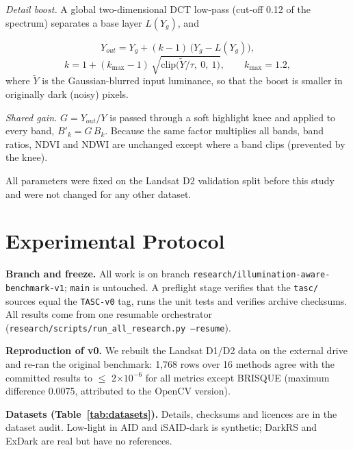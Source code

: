 \documentclass[conference]{IEEEtran}
\begin{document}
\emph{Detail boost.} A global two-dimensional DCT low-pass (cut-off 0.12 of the spectrum) separates a base layer $L(Y_g)$, and

\begin{equation}
Y_{out} = Y_g + (k - 1)\,\bigl(Y_g - L(Y_g)\bigr),
\end{equation}
\begin{equation}
k = 1 + (k_{\max} - 1)\,\sqrt{\mathrm{clip}\bigl(\tilde{Y}/\tau,\ 0,\ 1\bigr)},\qquad k_{\max} = 1.2,
\end{equation}
where $\tilde{Y}$ is the Gaussian-blurred input luminance, so that the boost is smaller in originally dark (noisy) pixels.

\emph{Shared gain.} $G = Y_{out}/Y$ is passed through a soft highlight knee and applied to every band, $B'_k = G\,B_k$. Because the same factor multiplies all bands, band ratios, NDVI and NDWI are unchanged except where a band clips (prevented by the knee).

All parameters were fixed on the Landsat D2 validation split before this study and were not changed for any other dataset.

\section{Experimental Protocol}
\textbf{Branch and freeze.} All work is on branch \texttt{research/illumination-aware-benchmark-v1}; \texttt{main} is untouched. A preflight stage verifies that the \texttt{tasc/} sources equal the \texttt{TASC-v0} tag, runs the unit tests and verifies archive checksums. All results come from one resumable orchestrator (\texttt{research/scripts/run\_all\_research.py --resume}).

\textbf{Reproduction of v0.} We rebuilt the Landsat D1/D2 data on the external drive and re-ran the original benchmark: 1,768 rows over 16 methods agree with the committed results to $\leq$ 2$\times$$10^{-6}$ for all metrics except BRISQUE (maximum difference 0.0075, attributed to the OpenCV version).

\textbf{Datasets (Table~\ref{tab:datasets}).} Details, checksums and licences are in the dataset audit. Low-light in AID and iSAID-dark is synthetic; DarkRS and ExDark are real but have no references.
\end{document}
